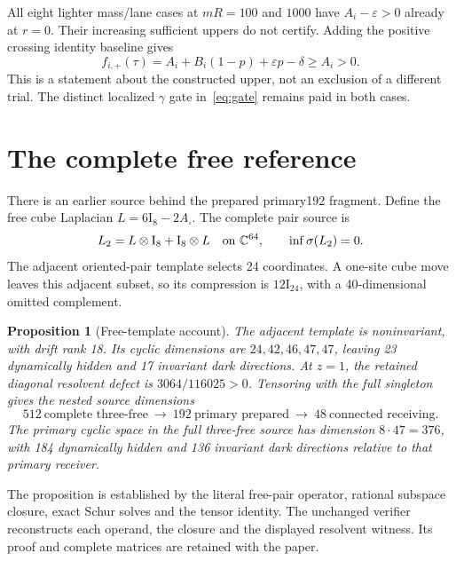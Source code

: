 \documentclass[11pt]{article}
\newtheorem{proposition}[theorem]{Proposition}
\theoremstyle{definition}
\newcommand{\Id}{\mathrm I}
\newcommand{\eps}{\varepsilon}
\begin{document}
All eight lighter mass/lane cases at $mR=100$ and $1000$ have $A_i-\eps>0$ already at $r=0$. Their increasing sufficient uppers do not certify. Adding the positive crossing identity baseline gives
\begin{equation}\label{eq:positivegate}
 f_{i,+}(\tau)=A_i+B_i(1-p)+\eps p-\delta\geq A_i>0.
\end{equation}
This is a statement about the constructed upper, not an exclusion of a different trial. The distinct localized $\gamma$ gate in~\eqref{eq:gate} remains paid in both cases.

\section{The complete free reference}\label{sec:free}

There is an earlier source behind the prepared primary192 fragment. Define the free cube Laplacian $L=6\Id_8-2A_\square$. The complete pair source is
\begin{equation}\label{eq:freepair}
 L_2=L\otimes\Id_8+\Id_8\otimes L
 \quad\hbox{on }\mathbb C^{64},\qquad \inf\sigma(L_2)=0.
\end{equation}
The adjacent oriented-pair template selects 24 coordinates. A one-site cube move leaves this adjacent subset, so its compression is $12\Id_{24}$, with a 40-dimensional omitted complement.

\begin{proposition}[Free-template account]\label{prop:free}
The adjacent template is noninvariant, with drift rank 18. Its cyclic dimensions are $24,42,46,47,47$, leaving 23 dynamically hidden and 17 invariant dark directions. At $z=1$, the retained diagonal resolvent defect is $3064/116025>0$. Tensoring with the full singleton gives the nested source dimensions
\begin{equation}\label{eq:nested}
 512\ \text{complete three-free}\ \longrightarrow\
 192\ \text{primary prepared}\ \longrightarrow\
 48\ \text{connected receiving}.
\end{equation}
The primary cyclic space in the full three-free source has dimension $8\cdot47=376$, with 184 dynamically hidden and 136 invariant dark directions relative to that primary receiver.
\end{proposition}

The proposition is established by the literal free-pair operator, rational subspace closure, exact Schur solves and the tensor identity. The unchanged verifier reconstructs each operand, the closure and the displayed resolvent witness. Its proof and complete matrices are retained with the paper.
\end{document}
